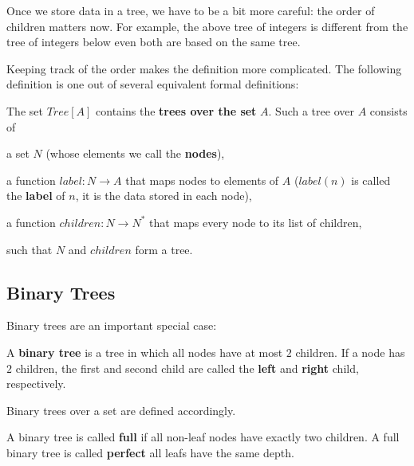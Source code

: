 Once we store data in a tree, we have to be a bit more careful: the order of children matters now.
For example, the above tree of integers is different from the tree of integers below even both are based on the same tree.

\begin{center}
\end{center}

Keeping track of the order makes the definition more complicated.
The following definition is one out of several equivalent formal definitions:

\begin{definition}\label{def:ad:labeledtree}
The set $Tree[A]$ contains the \textbf{trees over the set} $A$.
Such a tree over $A$ consists of
\begin{compactitem}
 \item a set $N$ (whose elements we call the \textbf{nodes}),
 \item a function $label:N\to A$ that maps nodes to elements of $A$ ($label(n)$ is called the \textbf{label} of $n$, it is the data stored in each node),
 \item a function $children:N\to N^*$ that maps every node to its list of children,
\end{compactitem}
such that $N$ and $children$ form a tree.
\end{definition}

\subsection{Binary Trees}

Binary trees are an important special case:

\begin{definition}\label{def:ad:bintree}
A \textbf{binary tree} is a tree in which all nodes have at most $2$ children.
If a node has $2$ children, the first and second child are called the \textbf{left} and \textbf{right} child, respectively.

Binary trees over a set are defined accordingly.

A binary tree is called \textbf{full} if all non-leaf nodes have exactly two children.
A full binary tree is called \textbf{perfect} all leafs have the same depth.
\end{definition}

